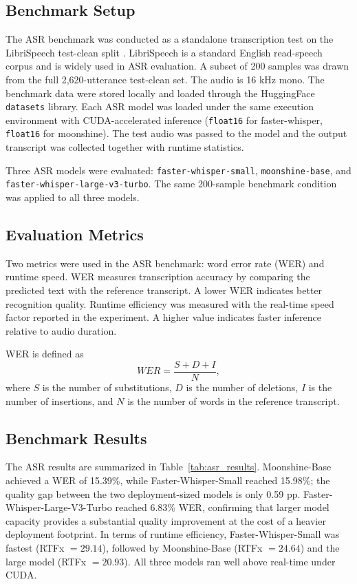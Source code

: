 \documentclass[12pt, a4paper]{article}
\begin{document}
\subsection{Benchmark Setup}

The ASR benchmark was conducted as a standalone transcription test on the LibriSpeech test-clean split \cite{panayotov2015librispeech}. LibriSpeech is a standard English read-speech corpus and is widely used in ASR evaluation. A subset of 200 samples was drawn from the full 2,620-utterance test-clean set. The audio is 16 kHz mono. The benchmark data were stored locally and loaded through the HuggingFace \texttt{datasets} library. Each ASR model was loaded under the same execution environment with CUDA-accelerated inference (\texttt{float16} for faster-whisper, \texttt{float16} for moonshine). The test audio was passed to the model and the output transcript was collected together with runtime statistics.

Three ASR models were evaluated: \texttt{faster-whisper-small}, \texttt{moonshine-base}, and \texttt{faster-whisper-large-v3-turbo}. The same 200-sample benchmark condition was applied to all three models.

\subsection{Evaluation Metrics}

Two metrics were used in the ASR benchmark: word error rate (WER) and runtime speed. WER measures transcription accuracy by comparing the predicted text with the reference transcript. A lower WER indicates better recognition quality. Runtime efficiency was measured with the real-time speed factor reported in the experiment. A higher value indicates faster inference relative to audio duration.

WER is defined as
\[
WER = \frac{S + D + I}{N},
\]
where $S$ is the number of substitutions, $D$ is the number of deletions, $I$ is the number of insertions, and $N$ is the number of words in the reference transcript.

\subsection{Benchmark Results}

The ASR results are summarized in Table~\ref{tab:asr_results}. Moonshine-Base achieved a WER of 15.39\%, while Faster-Whisper-Small reached 15.98\%; the quality gap between the two deployment-sized models is only 0.59 pp. Faster-Whisper-Large-V3-Turbo reached 6.83\% WER, confirming that larger model capacity provides a substantial quality improvement at the cost of a heavier deployment footprint. In terms of runtime efficiency, Faster-Whisper-Small was fastest (RTFx $= 29.14$), followed by Moonshine-Base (RTFx $= 24.64$) and the large model (RTFx $= 20.93$). All three models ran well above real-time under CUDA.
\end{document}
